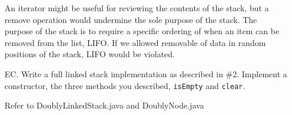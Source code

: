 \documentclass[10pt]{article}
\begin{document}
\begin{enumerate}
			\vspace{0.5cm}
			An iterator might be useful for reviewing the contents of the stack, but a remove operation would undermine the sole purpose of the stack. The purpose of the stack is to require a specific ordering of when an item can be removed from the list, LIFO. If we allowed removable of data in random positions of the stack, LIFO would be violated.
			\vspace{0.5cm}
		
		\item[EC.] Write a full linked stack implementation as described in \#2. Implement a constructor, the three methods you described, \texttt{isEmpty} and \texttt{clear}.
			
			\vspace{0.5cm}
			Refer to DoublyLinkedStack.java and DoublyNode.java
	\end{enumerate}
\end{document}
